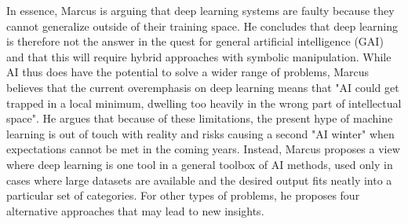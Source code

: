 \documentclass{article}
\begin{document}
In essence, Marcus is arguing that deep learning systems are faulty because they cannot generalize outside of their training space. He concludes that deep learning is therefore not the answer in the quest for general artificial intelligence (GAI) and that this will require hybrid approaches with symbolic manipulation. While AI thus does have the potential to solve a wider range of problems, Marcus believes that the current overemphasis on deep learning means that "AI could get trapped in a local minimum, dwelling too heavily in the wrong part of intellectual space". He argues that because of these limitations, the present hype of machine learning is out of touch with reality and risks causing a second "AI winter" when expectations cannot be met in the coming years.
Instead, Marcus proposes a view where deep learning is one tool in a general toolbox of AI methods, used only in cases where large datasets are available and the desired output fits neatly into a particular set of categories. For other types of problems, he proposes four alternative approaches that may lead to new insights.
\end{document}
